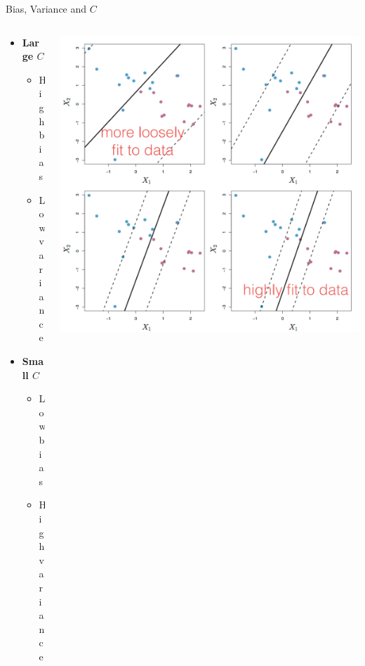 \begin{frame}{Bias, Variance and $C$}
    \begin{columns}
        \begin{column}{0.45\textwidth}
            \begin{itemize}
                \item \textbf{Large $C$}
                \begin{itemize}
                    \item High bias
                    \item Low variance
                \end{itemize}
                \vspace{0.5cm}
                \item \textbf{Small $C$}
                \begin{itemize}
                    \item Low bias
                    \item High variance
                \end{itemize}
            \end{itemize}
        \end{column}
        \begin{column}{0.55\textwidth}
            \centering
            \includegraphics[width=\textwidth]{images/support-vector-machines/support-vector-machines-15.png}
        \end{column}
    \end{columns}
\end{frame}


